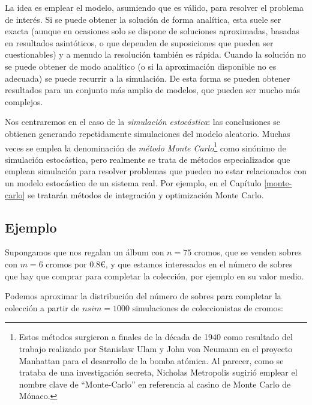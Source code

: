 \documentclass[
]{book}
\theoremstyle{break}
\theoremstyle{nonumberplain}
\begin{document}
La idea es emplear el modelo, asumiendo que es válido, para resolver el problema de interés.
Si se puede obtener la solución de forma analítica, esta suele ser exacta (aunque en ocasiones solo se dispone de soluciones aproximadas, basadas en resultados asintóticos, o que dependen de suposiciones que pueden ser cuestionables) y a menudo la resolución también es rápida.
Cuando la solución no se puede obtener de modo analítico (o si la aproximación disponible no es adecuada) se puede recurrir a la simulación.
De esta forma se pueden obtener resultados para un conjunto más amplio de modelos, que pueden ser mucho más complejos.

Nos centraremos en el caso de la \emph{simulación estocástica}: las conclusiones se obtienen generando repetidamente simulaciones del modelo aleatorio.
Muchas veces se emplea la denominación de \emph{método Monte Carlo}\footnote{Estos métodos surgieron a finales de la década de 1940 como resultado del trabajo realizado por Stanislaw Ulam y John von Neumann en el proyecto Manhattan para el desarrollo de la bomba atómica. Al parecer, como se trataba de una investigación secreta, Nicholas Metropolis sugirió emplear el nombre clave de ``Monte-Carlo'' en referencia al casino de Monte Carlo de Mónaco.} como sinónimo de simulación estocástica, pero realmente se trata de métodos especializados que emplean simulación para resolver problemas que pueden no estar relacionados con un modelo estocástico de un sistema real. Por ejemplo, en el Capítulo \ref{monte-carlo} se tratarán métodos de integración y optimización Monte Carlo.

\hypertarget{ealbum}{%
\subsection{Ejemplo}\label{ealbum}}

Supongamos que nos regalan un álbum con \(n = 75\) cromos, que se venden sobres con \(m = 6\) cromos por 0.8€, y que estamos interesados en el número de sobres que hay que comprar para completar la colección, por ejemplo en su valor medio.

Podemos aproximar la distribución del número de sobres para completar la colección a partir de \(nsim=1000\) simulaciones de coleccionistas de cromos:
\end{document}
